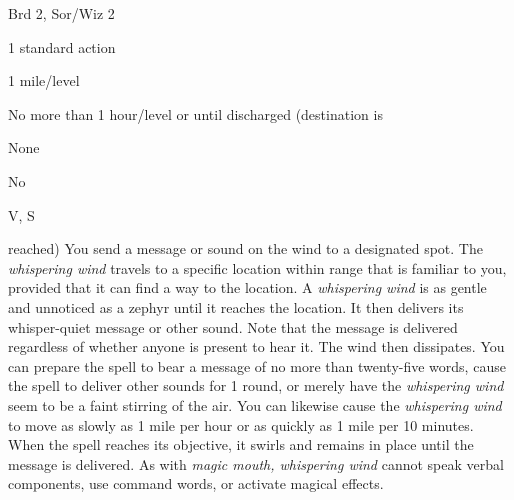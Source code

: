 
\begin{description*}
\item[Level:] Brd 2, Sor/Wiz 2
\item[Casting Time:] 1 standard action
\item[Range:] 1 mile/level
\item[Duration:] No more than 1 hour/level or until discharged (destination is
\item[Saving Throw:] None
\item[Spell Resistance:] No
\item[Components:] V, S
\end{description*}

reached)
You send a message or sound on the wind to a designated spot. The \textit{whispering
wind} travels to a specific location within range that is familiar to you, provided
that it can find a way to the location. A \textit{whispering wind} is as gentle
and unnoticed as a zephyr until it reaches the location. It then delivers its whisper-quiet
message or other sound. Note that the message is delivered regardless of whether
anyone is present to hear it. The wind then dissipates.
You can prepare the spell to bear a message of no more than twenty-five words,
cause the spell to deliver other sounds for 1 round, or merely have the \textit{whispering
wind} seem to be a faint stirring of the air. You can likewise cause the \textit{whispering
wind} to move as slowly as 1 mile per hour or as quickly as 1 mile per 10 minutes.
When the spell reaches its objective, it swirls and remains in place until the
message is delivered. As with \textit{magic mouth, whispering wind} cannot speak
verbal components, use command words, or activate magical effects.